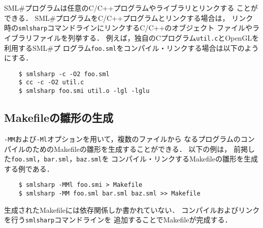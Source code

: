 \documentclass{jbook}
\newcommand{\smlsharp}{SML\#}
\begin{document}
	\smlsharp{}プログラムは任意のC/C++プログラムやライブラリとリンクする
ことができる．
	\smlsharp{}プログラムをC/C++プログラムとリンクする場合は，
リンク時の{\tt smlsharp}コマンドラインにリンクするC/C++のオブジェクト
ファイルやライブラリファイルを列挙する．
	例えば，独自のCプログラム{\tt util.c}とOpenGLを利用する\smlsharp{}プ
ログラム{\tt foo.sml}をコンパイル・リンクする場合は以下のようにする．
\begin{verbatim}
    $ smlsharp -c -O2 foo.sml
    $ cc -c -O2 util.c
    $ smlsharp foo.smi util.o -lgl -lglu
\end{verbatim}

\subsection{Makefileの雛形の生成}

	{\tt -MM}および{\tt -Ml}オプションを用いて，複数のファイルから
なるプログラムのコンパイルのためのMakefileの雛形を生成することができる．
	以下の例は，
前掲した{\tt foo.sml}，{\tt bar.sml}，{\tt baz.sml}を
コンパイル・リンクするMakefileの雛形を生成する例である．
\begin{verbatim}
    $ smlsharp -MMl foo.smi > Makefile
    $ smlsharp -MM foo.sml bar.sml baz.sml >> Makefile
\end{verbatim}
	生成されたMakefileには依存関係しか書かれていない．
	コンパイルおよびリンクを行う{\tt smlsharp}コマンドラインを
追加することでMakefileが完成する．

%
\end{document}
